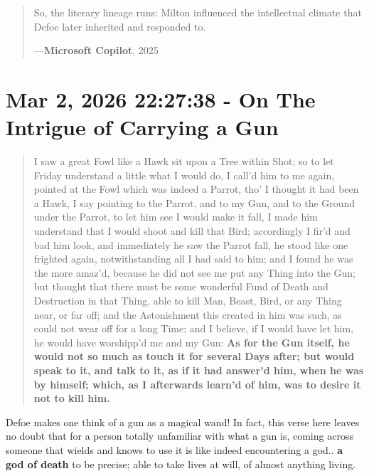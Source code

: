 \documentclass[a4paper]{article}
\begin{document}
\begin{minipage}{1\textwidth}
\begin{quotation}
{So, the literary lineage runs: Milton influenced the intellectual climate that Defoe later inherited and responded to.  


}
\hspace*{\fill} ---\textbf{Microsoft Copilot}, 2025\cite{copilot_assistant}
\end{quotation}
\vspace{1em}
\end{minipage}




\section{Mar 2, 2026 22:27:38 - On The Intrigue of Carrying a Gun}
\label{SEC55}


\noindent
\begin{minipage}{1\textwidth}
\vspace{1em}
\begin{quotation}
{\ttfamily


I saw a great Fowl like a Hawk sit upon a Tree within Shot; so to let Friday understand a little what I would do, I call’d him to me again, pointed at the Fowl which was indeed a Parrot, tho’ I thought it had been a Hawk, I say pointing to the Parrot, and to my Gun, and to the Ground under the Parrot, to let him see I would make it fall, I made him understand that I would shoot and kill that Bird; accordingly I fir’d and bad him look, and immediately he saw the Parrot fall, he stood like one frighted again, notwithstanding all I had said to him; and I found he was the more amaz’d, because he did not see me put any Thing into the Gun; but thought that there must be some wonderful Fund of Death and Destruction in that Thing, able to kill Man, Beast, Bird, or any Thing near, or far off; and the Astonishment this created in him was such, as could not wear off for a long Time; and I believe, if I would have let him, he would have worshipp’d me and my Gun: \textbf{As for the Gun itself, he would not so much as touch it for several Days after; but would speak to it, and talk to it, as if it had answer’d him, when he was by himself; which, as I afterwards learn’d of him, was to desire it not to kill him.}


}
\end{quotation}
\vspace{1em}
\end{minipage}



Defoe makes one think of a gun as a magical wand! In fact, this verse here leaves no doubt that for a person totally unfamiliar with what a gun is, coming across someone that wields and knows to use it is like indeed encountering a god.. \textbf{a god of death} to be precise; able to take lives at will, of almost anything living.
\end{document}
